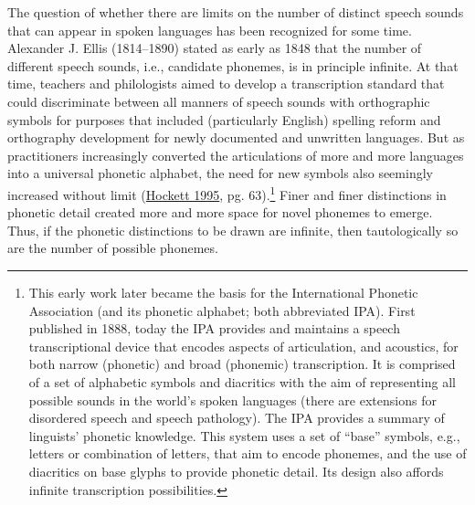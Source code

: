\documentclass[
]{article}
\begin{document}
The question of whether there are limits on the number of distinct
speech sounds that can appear in spoken languages has been recognized
for some time. Alexander J. Ellis (1814--1890) stated as early as 1848
that the number of different speech sounds, i.e., candidate phonemes, is
in principle infinite. At that time, teachers and philologists aimed to
develop a transcription standard that could discriminate between all
manners of speech sounds with orthographic symbols for purposes that
included (particularly English) spelling reform and orthography
development for newly documented and unwritten languages. But as
practitioners increasingly converted the articulations of more and more
languages into a universal phonetic alphabet, the need for new symbols
also seemingly increased without limit
(\protect\hyperlink{ref-Hockett1995-phoneme}{Hockett 1995}, pg.
63).\footnote{This early work later became the basis for the
  International Phonetic Association (and its phonetic alphabet; both
  abbreviated IPA). First published in 1888, today the IPA provides and
  maintains a speech transcriptional device that encodes aspects of
  articulation, and acoustics, for both narrow (phonetic) and broad
  (phonemic) transcription. It is comprised of a set of alphabetic
  symbols and diacritics with the aim of representing all possible
  sounds in the world's spoken languages (there are extensions for
  disordered speech and speech pathology). The IPA provides a summary of
  linguists' phonetic knowledge. This system uses a set of ``base''
  symbols, e.g., letters or combination of letters, that aim to encode
  phonemes, and the use of diacritics on base glyphs to provide phonetic
  detail. Its design also affords infinite transcription possibilities.}
Finer and finer distinctions in phonetic detail created more and more
space for novel phonemes to emerge. Thus, if the phonetic distinctions
to be drawn are infinite, then tautologically so are the number of
possible phonemes.
\end{document}
